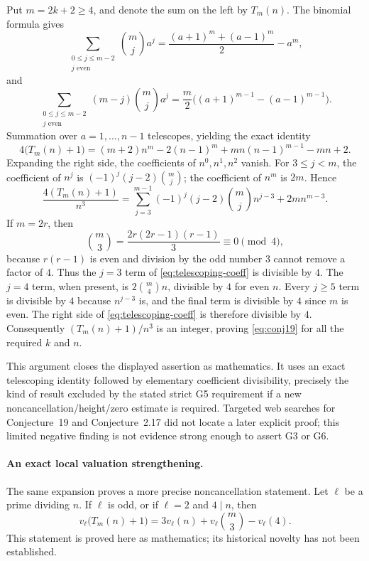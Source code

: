 \documentclass[11pt,a4paper]{article}
\theoremstyle{definition}
\theoremstyle{remark}
\begin{document}
Put $m=2k+2\ge4$, and denote the sum on the left by $T_m(n)$.
The binomial formula gives
\[
 \sum_{\substack{0\le j\le m-2\\ j\text{ even}}}
 \binom mj a^j
 =\frac{(a+1)^m+(a-1)^m}{2}-a^m,
\]
and
\[
 \sum_{\substack{0\le j\le m-2\\j\text{ even}}}
 (m-j)\binom mj a^j
 =\frac m2\bigl((a+1)^{m-1}-(a-1)^{m-1}\bigr).
\]
Summation over $a=1,\ldots,n-1$ telescopes, yielding the exact identity
\begin{equation}\label{eq:telescoping-conj19}
 4\bigl(T_m(n)+1\bigr)
 =(m+2)n^m-2(n-1)^m+mn(n-1)^{m-1}-mn+2.
\end{equation}
Expanding the right side, the coefficients of $n^0,n^1,n^2$ vanish.
For $3\le j<m$, the coefficient of $n^j$ is
$(-1)^j(j-2)\binom mj$; the coefficient of $n^m$ is $2m$.
Hence
\begin{equation}\label{eq:telescoping-coeff}
 \frac{4(T_m(n)+1)}{n^3}
 =\sum_{j=3}^{m-1}(-1)^j(j-2)\binom mj n^{j-3}
   +2m n^{m-3}.
\end{equation}
If $m=2r$, then
\[
 \binom m3=\frac{2r(2r-1)(r-1)}3\equiv0\pmod4,
\]
because $r(r-1)$ is even and division by the odd number $3$ cannot
remove a factor of $4$.  Thus the $j=3$ term of
\eqref{eq:telescoping-coeff} is divisible by $4$.
The $j=4$ term, when present, is $2\binom m4 n$, divisible by $4$
for even $n$.  Every $j\ge5$ term is divisible by $4$ because
$n^{j-3}$ is, and the final term is divisible by $4$ since $m$ is even.
The right side of \eqref{eq:telescoping-coeff} is therefore divisible
by $4$.  Consequently $(T_m(n)+1)/n^3$ is an integer, proving
\eqref{eq:conj19} for all the required $k$ and $n$.

This argument closes the displayed assertion as mathematics.  It uses
an exact telescoping identity followed by elementary coefficient
divisibility, precisely the kind of result excluded by the stated strict
G5 requirement if a new noncancellation/height/zero estimate is required.
Targeted web searches for Conjecture~19 and Conjecture~2.17 did not locate
a later explicit proof; this limited negative finding is not evidence
strong enough to assert G3 or G6.

\paragraph{An exact local valuation strengthening.}
The same expansion proves a more precise noncancellation statement.
Let $\ell$ be a prime dividing $n$.  If $\ell$ is odd, or if
$\ell=2$ and $4\mid n$, then
\begin{equation}\label{eq:exact-local-T}
 v_\ell\bigl(T_m(n)+1\bigr)
 =3v_\ell(n)+v_\ell\binom m3-v_\ell(4).
\end{equation}
This statement is proved here as mathematics; its historical novelty has
not been established.
\end{document}
